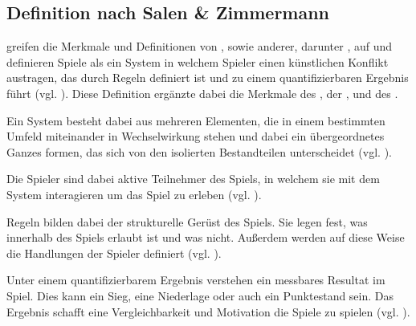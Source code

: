 \subsection{Definition nach Salen \& Zimmermann}
\cite{salen_rules_2003} greifen die Merkmale und Definitionen von \citeauthor{crawford_art_1984}, sowie anderer, darunter \cite{caillois_man_2001}, auf und definieren Spiele als ein System in welchem Spieler einen künstlichen Konflikt austragen, das durch Regeln definiert ist und zu einem quantifizierbaren Ergebnis führt (vgl. \citealp[Chapter 7, S. 11]{salen_rules_2003}). Diese Definition ergänzte dabei die Merkmale des , der ,  und des .

Ein System besteht dabei aus mehreren Elementen, die in einem bestimmten Umfeld miteinander in Wechselwirkung stehen und dabei ein übergeordnetes Ganzes formen, das sich von den isolierten Bestandteilen unterscheidet (vgl. \citealp[Chapter 5, S. 2]{salen_rules_2003}).

Die Spieler sind dabei aktive Teilnehmer des Spiels, in welchem sie mit dem System interagieren um das Spiel zu erleben (vgl. \citealp[Chapter 7, S. 11]{salen_rules_2003}).



Regeln bilden dabei der strukturelle Gerüst des Spiels. Sie legen fest, was innerhalb des Spiels erlaubt ist und was nicht. Außerdem werden auf diese Weise die Handlungen der Spieler definiert (vgl. \citealp[Chapter 7, S. 11]{salen_rules_2003}).

Unter einem quantifizierbarem Ergebnis verstehen \citeauthor{salen_rules_2003} ein messbares Resultat im Spiel. Dies kann ein Sieg, eine Niederlage oder auch ein Punktestand sein. Das Ergebnis schafft eine Vergleichbarkeit und Motivation die Spiele zu spielen (vgl. \citealp[Chapter 7, S. 11]{salen_rules_2003}).

